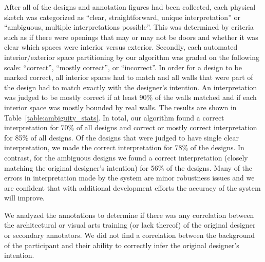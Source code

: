 After all of the designs and annotation figures had been collected,
each physical sketch was categorized as ``clear, straightforward,
unique interpretation'' or ``ambiguous, multiple interpretations
possible''.  This was determined by criteria such as if there were
openings that may or may not be doors and whether it was clear which
spaces were interior versus exterior.  Secondly, each automated
interior/exterior space partitioning by our algorithm was graded on
the following scale: ``correct'', ``mostly correct'', or
``incorrect''.  In order for a design to be marked correct, all
interior spaces had to match and all walls that were part of the
design had to match exactly with the designer's intention.  An
interpretation was judged to be mostly correct if at least 90\% of the
walls matched and if each interior space was mostly bounded by real
walls.  The results are shown in Table~\ref{table:ambiguity_stats}.
In total, our algorithm found a correct interpretation for 70\% of all
designs and correct or mostly correct interpretation for 85\% of all
designs.  Of the designs that were judged to have single clear
interpretation, we made the correct interpretation for 78\% of the
designs.  In contrast, for the ambiguous designs we found a correct
interpretation (closely matching the original designer's intention)
for 56\% of the designs.  Many of the errors in interpretation made by
the system are minor robustness issues and we are confident that with
additional development efforts the accuracy of the system will
improve.

We analyzed the annotations to determine if there was any correlation
between the architectural or visual arts training (or lack thereof) of
the original designer or secondary annotators.  We did not find a
correlation between the background of the participant and their ability
to correctly infer the original designer's intention.









